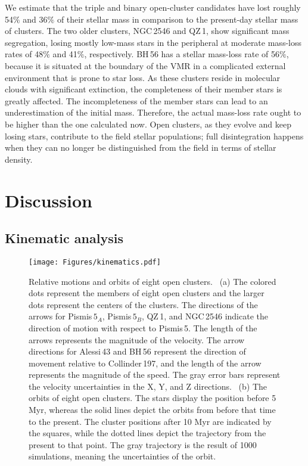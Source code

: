 \documentclass{aa} %
\begin{document}
We estimate that the triple and binary open-cluster candidates have lost roughly 54$\%$ and 36$\%$ of 
their stellar mass in comparison to the present-day stellar mass of clusters.
The two older clusters, NGC\,2546 and QZ\,1, show significant mass segregation,
losing mostly low-mass stars in the peripheral at moderate mass-loss rates of 48$\%$ and 
41$\%$, respectively. BH\,56 has a stellar mass-loss rate of 56$\%$, because it is situated at the 
boundary of the VMR in a complicated external environment that is prone to star loss. As these 
clusters reside in molecular clouds with significant extinction, the completeness of their member stars is greatly affected. The incompleteness of the member stars can lead to an underestimation of the initial mass. Therefore, the actual mass-loss rate ought to be higher than the one calculated now. 
Open clusters, as they evolve and keep losing stars, contribute to the field stellar populations; full disintegration happens when they can no longer be distinguished from the field in terms of stellar density.


\section{Discussion} \label{sec:discussion}

\subsection{Kinematic analysis} \label{sec:kinematics}
\begin{figure*}[ht]
    \centering
    \texttt{[image: Figures/kinematics.pdf]}
    \caption{Relative motions and orbits of eight open clusters. ~(a) The colored dots represent the members of eight open clusters and the larger dots 
    represent the centers of the clusters. The directions of the arrows for Pismis$\,5_{A}$, 
    Pismis$\,5_{B}$, QZ\,1, and NGC\,2546 indicate the direction of motion with respect to Pismis\,5. The 
    length of the arrows represents the magnitude of the velocity. The arrow directions for
    Alessi\,43 and BH\,56 represent the direction of movement relative to Collinder\,197, and the length 
    of the arrow represents the magnitude of the speed. The gray error bars represent the velocity 
    uncertainties in the X, Y, and Z directions. ~(b) The orbits of eight open clusters. 
    The stars display the position before 5 Myr, whereas the solid lines depict the orbits from 
    before that time to the present. The cluster positions after 10 Myr are indicated by the squares, 
    while the dotted lines depict the trajectory from the present to that point. The 
    gray trajectory is the result of 1000 simulations, meaning the uncertainties of the orbit.
    \label{fig:kinematics}}
    \end{figure*} 
\end{document}
